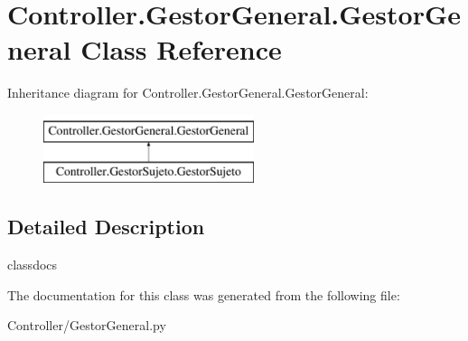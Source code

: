 \hypertarget{class_controller_1_1_gestor_general_1_1_gestor_general}{}\section{Controller.\+Gestor\+General.\+Gestor\+General Class Reference}
\label{class_controller_1_1_gestor_general_1_1_gestor_general}
Inheritance diagram for Controller.\+Gestor\+General.\+Gestor\+General\+:\begin{figure}[H]
\begin{center}
\leavevmode
\includegraphics[height=2.000000cm]{class_controller_1_1_gestor_general_1_1_gestor_general}
\end{center}
\end{figure}


\subsection{Detailed Description}
\begin{DoxyVerb}classdocs
\end{DoxyVerb}
 

The documentation for this class was generated from the following file\+:\begin{DoxyCompactItemize}
\item 
Controller/Gestor\+General.\+py\end{DoxyCompactItemize}
